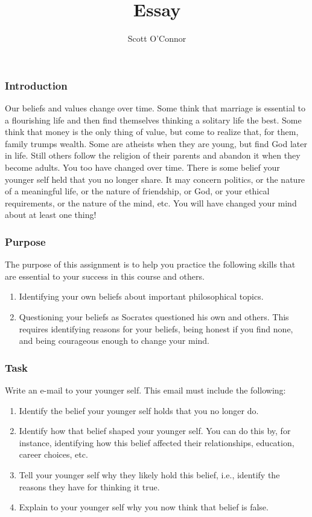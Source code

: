 \documentclass[10]{article}
\title{Essay}
\author{Scott O’Connor}
\providecommand{\tightlist}{%
  \setlength{\itemsep}{0pt}\setlength{\parskip}{0pt}}
\begin{document}
\subsubsection{Introduction}\label{introduction}

Our beliefs and values change over time. Some think that marriage is
essential to a flourishing life and then find themselves thinking a
solitary life the best. Some think that money is the only thing of
value, but come to realize that, for them, family trumps wealth. Some
are atheists when they are young, but find God later in life. Still
others follow the religion of their parents and abandon it when they
become adults. You too have changed over time. There is some belief your
younger self held that you no longer share. It may concern politics, or
the nature of a meaningful life, or the nature of friendship, or God, or
your ethical requirements, or the nature of the mind, etc. You will have
changed your mind about at least one thing!

\subsubsection{Purpose}\label{purpose}

The purpose of this assignment is to help you practice the following
skills that are essential to your success in this course and others.

\begin{enumerate}
\def\labelenumi{\arabic{enumi}.}
\item
  Identifying your own beliefs about important philosophical topics.
\item
  Questioning your beliefs as Socrates questioned his own and others.
  This requires identifying reasons for your beliefs, being honest if
  you find none, and being courageous enough to change your mind.
\end{enumerate}

\subsubsection{Task}\label{task}

Write an e-mail to your younger self. This email must include the
following:

\begin{enumerate}
\def\labelenumi{\arabic{enumi}.}
\tightlist
\item
  Identify the belief your younger self holds that you no longer do.
\item
  Identify how that belief shaped your younger self. You can do this by,
  for instance, identifying how this belief affected their
  relationships, education, career choices, etc.
\item
  Tell your younger self why they likely hold this belief, i.e.,
  identify the reasons they have for thinking it true.
\item
  Explain to your younger self why you now think that belief is false.
\end{enumerate}
\end{document}
